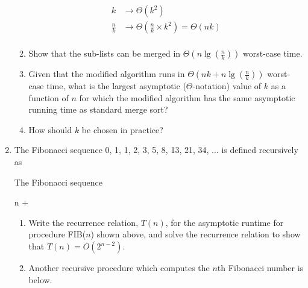 \documentclass[12pt]{report}
\newcommand{\choicelabel}{\alph*)}
\begin{document}
\begin{enumerate}[label=\arabic*.]
\begin{enumerate}[label=\arabic{enumi}\choicelabel]
{\begin{equation*}
	    \begin{aligned}
	    	k &\rightarrow \Theta\left( k^{2} \right)\\
			\frac{n}{k} &\rightarrow \Theta\left( \frac{n}{k} \times k^{2} \right)=\Theta(nk)\\
	    \end{aligned}
	    \end{equation*}}
		\item Show that the sub-lists can be merged in $\Theta(n\lg \left( \frac{n}{k} \right))$ worst-case time.
		\item Given that the modified algorithm runs in $\Theta(nk+n\lg\left( \frac{n}{k} \right))$ worst-case time, what is the largest asymptotic ($\Theta$-notation) value of $k$ as a function of $n$ for which the modified algorithm has the same asymptotic running time as standard merge sort?
		\item How should $k$ be chosen in practice?
	\end{enumerate}
	\item The Fibonacci sequence 0, 1, 1, 2, 3, 5, 8, 13, 21, 34, $\dots$ is defined recursively as
\begin{algorithm}[H]
	\caption{The Fibonacci sequence}\label{alg:fib}
	\begin{algorithmic}[1]
			\Return n
		\EndIf
		\State \Return {} + 
	\EndFunction
	\end{algorithmic}
\end{algorithm}
	\begin{enumerate}[label=\arabic{enumi}\choicelabel]
	    \item Write the recurrence relation, $T(n)$, for the asymptotic runtime for procedure FIB($n$) shown above, and solve the recurrence relation to show that $T(n)=O\left( 2^{n-2} \right)$.
		\item Another recursive procedure which computes the $n$th Fibonacci number is below. \begin{algorithm}[H]

\end{algorithm}
\end{enumerate}
\end{enumerate}
\end{document}
